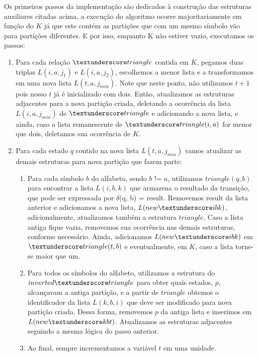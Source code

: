 \documentclass[12pt]{article}
\begin{document}
Os primeiros passos da implementação são dedicados à construção das estruturas auxiliares citadas acima, a execução do algoritmo ocorre majoritariamente em função do $K$ já que este contém as partições que com um mesmo símbolo vão para partições diferentes. E por isso, enquanto K não estiver vazio, executamos os passos: 
\begin{enumerate}
    \item Para cada relação $\textunderscore triangle$ contida em $K$, pegamos duas triplas $L(i, a, j_1)$ e $L(i, a, j_2)$, escolhemos a menor lista e a transformamos em uma nova lista $L(t, a, j_{min})$. Note que neste ponto, não utilizamos $t+1$ pois nosso $t$ já é inicializado com dois. Então, atualizamos as estruturas adjacentes para a nova partição criada, deletando a ocorrência da lista $L(i, a, j_{min})$ de $\textunderscore triangle$ e adicionando a nova lista, e ainda, caso a lista remanescente de $\textunderscore triangle(i, a)$ for menor que dois, deletamos sua ocorrência de $K$. 
    \item Para cada estado $q$ contido na nova lista $L(t, a, j_{min})$ vamos atualizar as demais estruturas para nova partição que fazem parte:
    \begin{enumerate}
        \item Para cada símbolo $b$ do alfabeto, sendo $b$ != $a$, utilizamos $triangle(q, b)$ para encontrar a lista $L(i, b, k)$ que armazena o resultado da transição, que pode ser expressada por $\delta$(q, b) = result. Removemos result da lista anterior e adicionamos a nova lista, $L(new\textunderscore ibk)$, adicionalmente, atualizamos também a estrutura $triangle$. Caso a lista antiga fique vazia, removemos sua ocorrência nas demais estruturas, conforme necessário. Ainda, adicionamos $L(new\textunderscore ibk)$ em $\textunderscore triangle(t, b)$ e eventualmente, em $K$, caso a lista torne-se maior que um. 
        \item Para todos os símbolos do alfabeto, utilizamos a estrutura do $inverted\textunderscore triangle$ para obter quais estados, $p$, alcançavam a antiga partição, e a partir de $triangle$ obtemos o identificador da lista $L(k, b, i)$ que deve ser modificado para nova partição criada. Dessa forma, removemos $p$ da antiga lista e inserimos em $L(new\textunderscore kbt)$. Atualizamos as estruturas adjacentes seguindo a mesma lógica do passo anterior.
        \item Ao final, sempre incrementamos a variável $t$ em uma unidade.
    \end{enumerate}
\end{enumerate}  
\end{document}
